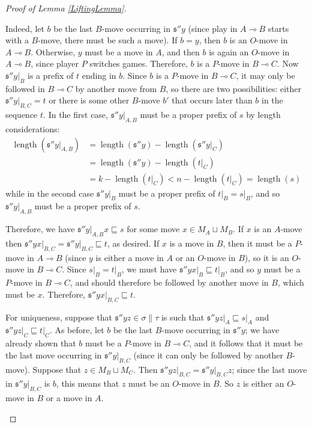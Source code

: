 \documentclass[11pt]{article} %
\theoremstyle{plain} %
\theoremstyle{definition} %
\theoremstyle{note}
\theoremstyle{exercisestyle}
\renewcommand{\implies}{\multimap}
\newcommand{\cprd}{\sqcup}
\newcommand{\s}{\mathfrak s}
\newcommand{\prefix}{\sqsubseteq}
\DeclareMathOperator{\length}{length}
\begin{document}
\begin{proof}[Proof of Lemma \ref{LiftingLemma}]
\begin{itemize}
      Indeed, let $b$ be the last $B$-move occurring in $\s''y$ (since play in $A\implies B$ starts with a $B$-move, there must be such a move).  If $b=y$, then $b$ is an $O$-move in $A\implies B$.  Otherwise, $y$ must be a move in $A$, and then $b$ is again an $O$-move in $A\implies B$, since player $P$ switches games.  Therefore, $b$ is a $P$-move in $B\implies C$.  Now $\s''y\vert_B$ is a prefix of $t$ ending in $b$.  Since $b$ is a $P$-move in $B\implies C$, it may only be followed in $B\implies C$ by another move from $B$, so there are two possibilities: either $\s''y\vert_{B,C}=t$ or there is some other $B$-move $b'$ that occurs later than $b$ in the sequence $t$.  In the first case, $\s''y\vert_{A,B}$ must be a proper prefix of $s$ by length considerations:
      \begin{align*}
        \length(\s''y\vert_{A,B}) & = \length(\s''y) - \length(\s''y\vert_C) \\
          & = \length(\s''y) - \length(t\vert_C) \\
          & = k - \length(t\vert_C) < n - \length(t\vert_C) = \length(s)
      \end{align*}
      while in the second case $\s''y\vert_B$ must be a proper prefix of $t\vert_B=s\vert_B$, and so $\s''y\vert_{A,B}$ must be a proper prefix of $s$.

      Therefore, we have $\s''y\vert_{A,B}x\prefix s$ for some move $x\in M_A\cprd M_B$.  If $x$ is an $A$-move then $\s''yx\vert_{B,C}=\s''y\vert_{B,C}\prefix t$, as desired.  If $x$ is a move in $B$, then it must be a $P$-move in $A\implies B$ (since $y$ is either a move in $A$ or an $O$-move in $B$), so it is an $O$-move in $B\implies C$.  Since $s\vert_B=t\vert_B$, we must have $\s''yx\vert_B\prefix t\vert_B$, and so $y$ must be a $P$-move in $B\implies C$, and should therefore be followed by another move in $B$, which must be $x$.  Therefore, $\s''yx\vert_{B,C}\prefix t$.

      For uniqueness, suppose that $\s''yz\in\sigma\|\tau$ is such that $\s''yz\vert_A\prefix s\vert_A$ and $\s''yz\vert_C\prefix t\vert_C$.  As before, let $b$ be the last $B$-move occurring in $\s''y$; we have already shown that $b$ must be a $P$-move in $B\implies C$, and it follows that it must be the last move occurring in $\s''y\vert_{B,C}$ (since it can only be followed by another $B$-move).  Suppose that $z\in M_B\cprd M_C$.  Then $\s''yz\vert_{B,C}=\s''y\vert_{B,C}z$; since the last move in $\s''y\vert_{B,C}$ is $b$, this means that $z$ must be an $O$-move in $B$.  So $z$ is either an $O$-move in $B$ or a move in $A$.


\end{itemize}
\end{proof}
\end{document}
